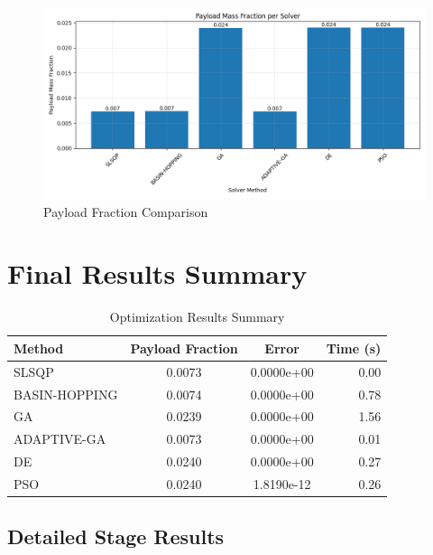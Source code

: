 \documentclass{article}
\begin{document}
\begin{figure}[H]
\centering
\includegraphics[width=\textwidth]{payload_fraction.png}
\caption{Payload Fraction Comparison}
\end{figure}

\section{Final Results Summary}
\begin{table}[H]
\centering
\caption{Optimization Results Summary}
\begin{tabular}{lccr}
\toprule
Method & Payload Fraction & Error & Time (s) \\
\midrule
SLSQP & 0.0073 & 0.0000e+00 & 0.00 \\
BASIN-HOPPING & 0.0074 & 0.0000e+00 & 0.78 \\
GA & 0.0239 & 0.0000e+00 & 1.56 \\
ADAPTIVE-GA & 0.0073 & 0.0000e+00 & 0.01 \\
DE & 0.0240 & 0.0000e+00 & 0.27 \\
PSO & 0.0240 & 1.8190e-12 & 0.26 \\
\bottomrule
\end{tabular}
\end{table}

\subsection{Detailed Stage Results}
\end{document}
